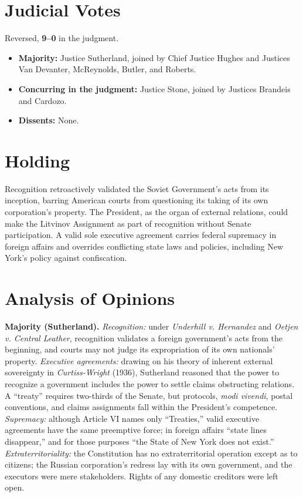 \documentclass[12pt]{article}
\begin{document}
\section{Judicial Votes}

Reversed, \textbf{9--0} in the judgment.
\begin{itemize}
\item \textbf{Majority:} Justice Sutherland, joined by Chief Justice Hughes and Justices Van Devanter, McReynolds, Butler, and Roberts.
\item \textbf{Concurring in the judgment:} Justice Stone, joined by Justices Brandeis and Cardozo.
\item \textbf{Dissents:} None.
\end{itemize}

\section{Holding}

Recognition retroactively validated the Soviet Government's acts from its inception, barring American courts from questioning its taking of its own corporation's property. The President, as the organ of external relations, could make the Litvinov Assignment as part of recognition without Senate participation. A valid sole executive agreement carries federal supremacy in foreign affairs and overrides conflicting state laws and policies, including New York's policy against confiscation.

\section{Analysis of Opinions}

\textbf{Majority (Sutherland).} \emph{Recognition:} under \textit{Underhill v. Hernandez} and \textit{Oetjen v. Central Leather}, recognition validates a foreign government's acts from the beginning, and courts may not judge its expropriation of its own nationals' property. \emph{Executive agreements:} drawing on his theory of inherent external sovereignty in \textit{Curtiss-Wright} (1936), Sutherland reasoned that the power to recognize a government includes the power to settle claims obstructing relations. A ``treaty'' requires two-thirds of the Senate, but protocols, \textit{modi vivendi}, postal conventions, and claims assignments fall within the President's competence. \emph{Supremacy:} although Article VI names only ``Treaties,'' valid executive agreements have the same preemptive force; in foreign affairs ``state lines disappear,'' and for those purposes ``the State of New York does not exist.'' \emph{Extraterritoriality:} the Constitution has no extraterritorial operation except as to citizens; the Russian corporation's redress lay with its own government, and the executors were mere stakeholders. Rights of any domestic creditors were left open.
\end{document}
